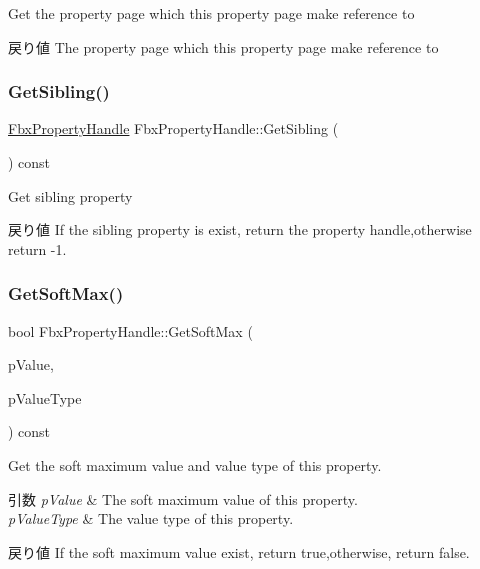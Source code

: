 Get the property page which this property page make reference to \begin{DoxyReturn}{戻り値}
The property page which this property page make reference to 
\end{DoxyReturn}
\mbox{\label{class_fbx_property_handle_a216afaae427671182799347b99a1eb12}} 
\subsubsection{\texorpdfstring{Get\+Sibling()}{GetSibling()}}
{\footnotesize\ttfamily \hyperlink{class_fbx_property_handle}{Fbx\+Property\+Handle} Fbx\+Property\+Handle\+::\+Get\+Sibling (\begin{DoxyParamCaption}{ }\end{DoxyParamCaption}) const}

Get sibling property \begin{DoxyReturn}{戻り値}
If the sibling property is exist, return the property handle,otherwise return -\/1. 
\end{DoxyReturn}
\mbox{\label{class_fbx_property_handle_a2cc9715f192ec19f46f4baaef4baf075}} 
\subsubsection{\texorpdfstring{Get\+Soft\+Max()}{GetSoftMax()}\hspace{0.1cm}{\footnotesize\ttfamily [1/2]}}
{\footnotesize\ttfamily bool Fbx\+Property\+Handle\+::\+Get\+Soft\+Max (\begin{DoxyParamCaption}\item[{void $\ast$}]{p\+Value,  }\item[{\hyperlink{fbxpropertytypes_8h_a73913a5ddfb20e57c6f25e9e6784bd92}{E\+Fbx\+Type}}]{p\+Value\+Type }\end{DoxyParamCaption}) const}

Get the soft maximum value and value type of this property. 
\begin{DoxyParams}{引数}
{\em p\+Value} & The soft maximum value of this property. \\
\hline
{\em p\+Value\+Type} & The value type of this property. \\
\hline
\end{DoxyParams}
\begin{DoxyReturn}{戻り値}
If the soft maximum value exist, return true,otherwise, return false. 
\end{DoxyReturn}
\mbox{\label{class_fbx_property_handle_a302beaa7745f9f5f3cd92e7b4f42d576}} 
